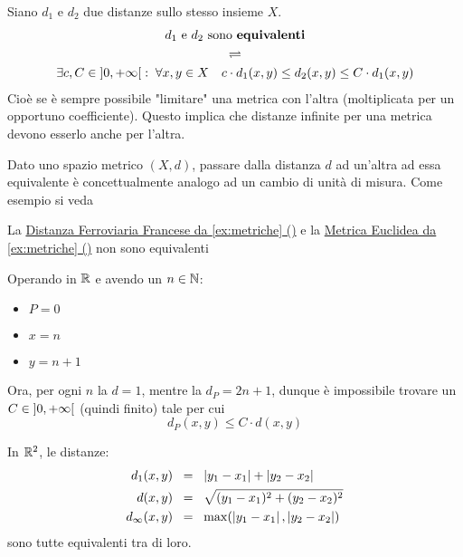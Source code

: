 \begin{definition}
	Siano $d_1$ e $d_2$ due distanze sullo stesso insieme $X$.\\
	\begin{equation*}
		\begin{gathered}
			d_1 \text{ e } d_2 \text{ sono \textbf{equivalenti}}\\
			\rightleftharpoons\\
			\exists c,C \in \left]0,+\infty\right[:\; \forall x,y \in X \quad c \cdot d_1(x,y) \leq d_2 (x,y) \leq C \cdot d_1 (x,y)
		\end{gathered}
	\end{equation*}
	Cioè se è sempre possibile "limitare" una metrica con l'altra (moltiplicata per un opportuno coefficiente). Questo implica che distanze infinite per una metrica devono esserlo anche per l'altra.
	\begin{note}
		Dato uno spazio metrico $(X,d)$, passare dalla distanza $d$ ad un'altra ad essa equivalente è concettualmente analogo ad un cambio di unità di misura. Come esempio si veda 
	\end{note}
\end{definition}
\begin{example}
	La \hyperref[ex:dist_parigi]{Distanza Ferroviaria Francese da \cref*{ex:metriche} ()} e la \hyperref[ex:dist_eucl]{Metrica Euclidea da \cref*{ex:metriche} ()} non sono equivalenti
	\begin{solution}
		Operando in $\mathbb{R}$ e avendo un $n \in \mathbb{N}$:
		\begin{itemize}
			\item $P = 0$
			\item $x = n$
			\item $y = n+1$
		\end{itemize}
		Ora, per ogni $n$ la $d = 1$, mentre la $d_P = 2n+1$, dunque è impossibile trovare un $C \in \left]0,+\infty\right[$ (quindi finito) tale per cui
		$$d_P(x,y) \leq C \cdot d(x,y)$$
	\end{solution}
\end{example}
\begin{example}
	\label{ex:metr_equiv_R2}
	In $\mathbb{R}^2$, le distanze:
	\begin{align*}
		d_1(x,y) \;\; &= \;\; \left|y_1 - x_1\right| + \left|y_2 - x_2\right|\\
		d(x,y) \;\; &= \;\; \sqrt{(y_1 - x_1)^2 + (y_2 - x_2)^2}\\
		d_\infty(x,y) \;\; &= \;\; \max (\left|y_1 - x_1\right|, \left|y_2 - x_2\right|)
	\end{align*}
	sono tutte equivalenti tra di loro.
\end{example}


